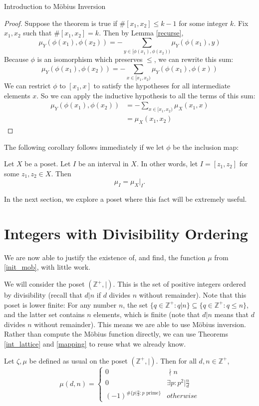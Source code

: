 \documentclass[12pt]{pom_thesis}
\newcommand{\Zz}{\mathbb{Z}}
\begin{document}
\begin{chapter}{Introduction to M\"obius Inversion}
\begin{proof}
Suppose the theorem is true if $\#[x_1, x_2] \leq k-1$ for some integer $k$. Fix $x_1, x_2$ such that $\#[x_1, x_2] = k$. Then by Lemma \ref{recurse},
\[
\mu_Y(\phi(x_1), \phi(x_2)) = -\sum_{y \in [\phi(x_1), \phi(x_2))}\mu_Y(\phi(x_1), y)
\]
Because $\phi$ is an isomorphism which preserves $\leq$, we can rewrite this sum:
\[
\mu_Y(\phi(x_1), \phi(x_2)) = -\sum_{x \in [x_1, x_2)}\mu_Y(\phi(x_1), \phi(x))
\]
We can restrict $\phi$ to $[x_1, x]$ to satisfy the hypotheses for all intermediate elements $x$. So we can apply the inductive hypothesis to all the terms of this sum:
\begin{align*}
\mu_Y(\phi(x_1), \phi(x_2)) &= -\sum_{x \in [x_1, x_2)}\mu_X(x_1, x)\\
&= \mu_X(x_1, x_2)
\end{align*}
\end{proof}
The following corollary follows immediately if we let $\phi$ be the inclusion map:
\begin{cor}\label{subset}
Let $X$ be a poset. Let $I$ be an interval in $X$. In other words, let $I = [z_1, z_2]$ for some $z_1, z_2 \in X$. Then
\[
\mu_I = \mu_X|_I.
\]
\end{cor}
In the next section, we explore a poset where this fact will be extremely useful. 

\section{Integers with Divisibility Ordering}
We are now able to justify the existence of, and find, the function $\mu$ from \eqref{init_mob}, with little work.

We will consider the poset $(\Zz^{+}, |)$. This is the set of positive integers ordered by divisibility (recall that $d|n$ if $d$ divides $n$ without remainder). Note that this poset is lower finite: For any number $n$, the set $\{q \in \Zz^{+}: q|n\} \subseteq \{q \in \Zz^{+}: q \leq n\}$, and the latter set contains $n$ elements, which is finite (note that $d|n$ means that $d$ divides $n$ without remainder). This means we are able to use M\"obius inversion. Rather than compute the M\"obius function directly, we can use Theorems \ref{int_lattice} and \ref{mapping} to reuse what we already know.

\begin{thm}\label{mu_div}
Let $\zeta, \mu$ be defined as usual on the poset $(\Zz^+, |)$. Then for all $d,n \in \Zz^+$,
\[
\mu(d,n) =
\begin{cases}
0 & \nmid n \\
0 & \exists p: p^2|\frac nd\\
(-1)^{\#\{p|\frac nd : p \text{ prime}\}} & otherwise
\end{cases}
\]
\end{thm}


\end{chapter}
\end{document}
